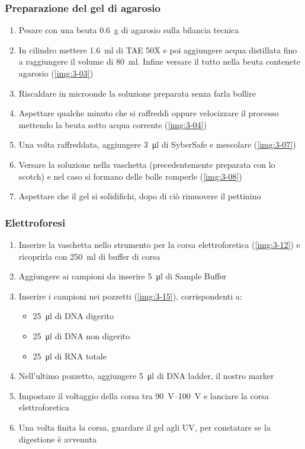 \subsubsection{Preparazione del gel di agarosio}\label{sssec:agarosio}
\begin{enumerate}
	\item Pesare con una beuta \qty{0.6}{\g} di agarosio sulla bilancia tecnica 
	\item In cilindro mettere \qty{1.6}{\ml} di TAE 50X e poi aggiungere acqua distillata fino a raggiungere il volume di \qty{80}{\ml}. Infine versare il tutto nella beuta contenete agarosio (\autoref{img:3-03})
	\item Riscaldare in microonde la soluzione preparata senza farla bollire
	\item Aspettare qualche minuto che si raffreddi oppure velocizzare il processo mettendo la beuta sotto acqua corrente (\autoref{img:3-04})
	\item Una volta raffreddata, aggiungere \qty{3}{\micro\litre} di SyberSafe e mescolare (\autoref{img:3-07})
	\item Versare la soluzione nella vaschetta (precedentemente preparata con lo scotch) e nel caso si formano delle bolle romperle (\autoref{img:3-08})
	\item Aspettare che il gel si solidifichi, dopo di ciò rimuovere il pettinino
\end{enumerate}

\subsubsection{Elettroforesi}
\begin{enumerate}
	\item Inserire la vaschetta nello strumento per la corsa elettroforetica (\autoref{img:3-12}) e ricoprirla con \qty{250}{\ml} di buffer di corsa 
	\item Aggiungere ai campioni da inserire \qty{5}{\micro\litre} di \foreignlanguage{english}{Sample Buffer}
	\item Inserire i campioni nei pozzetti (\autoref{img:3-15}), corrispondenti a:
	\begin{itemize}
		\item \qty{25}{\micro\litre} di DNA digerito
		\item \qty{25}{\micro\litre} di DNA non digerito
		\item \qty{25}{\micro\litre} di RNA totale
	\end{itemize}
	\item Nell'ultimo pozzetto, aggiungere \qty{5}{\micro\litre} di DNA \foreignlanguage{english}{ladder}, il nostro marker
	\item Impostare il voltaggio della corsa tra \qtyrange{90}{100}{\volt} e lanciare la corsa elettroforetica
	\item Una volta finita la corsa, guardare il gel agli UV, per constatare se la digestione è avvenuta
\end{enumerate}

